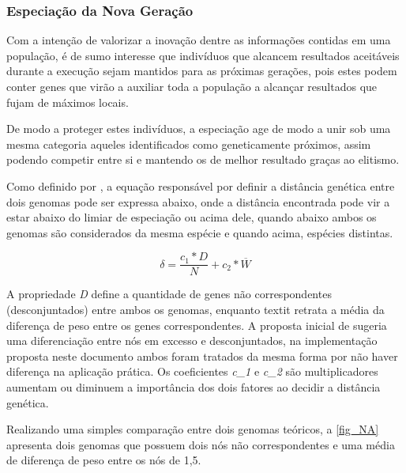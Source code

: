 \subsubsection{Especiação da Nova Geração}
Com a intenção de valorizar a inovação dentre as informações contidas em uma população, é de sumo interesse que indivíduos que alcancem resultados aceitáveis durante a execução sejam mantidos para as próximas gerações, pois estes podem conter genes que virão a auxiliar toda a população a alcançar resultados que fujam de máximos locais.

De modo a proteger estes indivíduos, a especiação age de modo a unir sob uma mesma categoria aqueles identificados como geneticamente próximos, assim podendo competir entre si e mantendo os de melhor resultado graças ao elitismo.

Como definido por \cite{stanley2004neat}, a equação responsável por definir a distância genética entre dois genomas pode ser expressa abaixo, onde a distância  encontrada pode vir a estar abaixo do limiar de especiação ou acima dele, quando abaixo ambos os genomas são considerados da mesma espécie e quando acima, espécies distintas.

\[ \delta = \frac{c_1 * D}{N} + c_2 * \overline{W}\]

A propriedade \textit{D} define a quantidade de genes não correspondentes (desconjuntados) entre ambos os genomas, enquanto textit{} retrata a média da diferença de peso entre os genes correspondentes. A proposta inicial de \cite{stanley2002neat} sugeria uma diferenciação entre nós em excesso e desconjuntados, na implementação proposta neste documento ambos foram tratados da mesma forma por não haver diferença na aplicação prática. Os coeficientes \textit{c_1} e \textit{c_2} são multiplicadores aumentam ou diminuem a importância dos dois fatores ao decidir a distância genética.

Realizando uma simples comparação entre dois genomas teóricos, a \autoref{fig_NA} apresenta dois genomas que possuem dois nós não correspondentes e uma média de diferença de peso entre os nós de 1,5.

